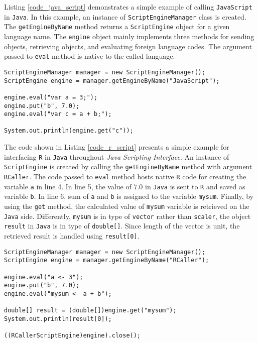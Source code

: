 \documentclass[10pt,a4paper, final, oneside]{article}
\begin{document}
Listing \ref{code_java_script} demonstrates a simple example of calling \texttt{JavaScript} in \texttt{Java}. In this example, an instance of \texttt{ScriptEngineManager} class is created. The \texttt{getEngineByName} method returns a \texttt{ScriptEngine} object for a given language name. The \texttt{engine} object mainly implements three methods for sending objects, retrieving objects, and evaluating foreign language codes. The argument passed to \texttt{eval} method is native to the called language. 


\begin{minipage}{\linewidth}
\begin{lstlisting}[caption=Calling JavaScript,label=code_java_script]
ScriptEngineManager manager = new ScriptEngineManager();
ScriptEngine engine = manager.getEngineByName("JavaScript");
        
engine.eval("var a = 3;");
engine.put("b", 7.0);
engine.eval("var c = a + b;");
        
System.out.println(engine.get("c"));
\end{lstlisting}
\end{minipage}

The code shown in Listing \ref{code_r_script} presents a simple example for interfacing \texttt{R} in \texttt{Java} throughout \emph{Java Scripting Interface}. An instance of \texttt{ScriptEngine} is created by calling the \texttt{getEngineByName} method with argument \texttt{RCaller}. The code passed to \texttt{eval} method hosts native \texttt{R} code for creating the variable \texttt{a} in line 4. In line 5, the value of $7.0$ in \texttt{Java} is sent to \texttt{R} and saved as variable \texttt{b}. In line 6, sum of \texttt{a} and  \texttt{b} is assigned to the variable \texttt{mysum}. Finally, by using the \texttt{get} method, the calculated value of \texttt{mysum} variable is retrieved on the \texttt{Java} side. Differently, \texttt{mysum} is in type of \texttt{vector} rather than \texttt{scaler}, the object \texttt{result} in \texttt{Java} is in type of \texttt{double[]}. Since length of the vector is unit, the retrieved result is handled using \texttt{result[0]}.

\begin{minipage}{\linewidth}
\begin{lstlisting}[caption=Calling R,label=code_r_script]
ScriptEngineManager manager = new ScriptEngineManager();
ScriptEngine engine = manager.getEngineByName("RCaller");
        
engine.eval("a <- 3");
engine.put("b", 7.0);
engine.eval("mysum <- a + b");
        
double[] result = (double[])engine.get("mysum");
System.out.println(result[0]);
        
((RCallerScriptEngine)engine).close();
\end{lstlisting}
\end{minipage}
\end{document}
